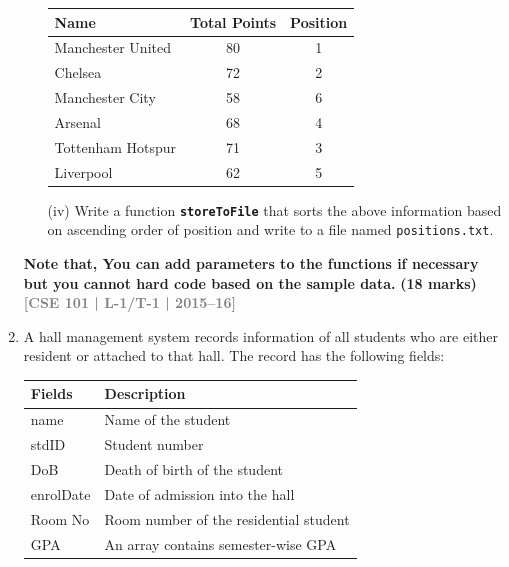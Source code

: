 \documentclass[12pt,a3paper]{article}
\newcommand{\yr}[1]{\hfill\textcolor{gray}{\small\textbf{[#1]}}}
\newcommand{\mk}[1]{\textcolor{orange!70!black}{\small\textbf{(#1 marks)}}}
\begin{document}
\begin{enumerate}
\begin{enumerate}
        \begin{center}
        \begin{tabular}{|l|c|c|}
        \hline
        \textbf{Name} & \textbf{Total Points} & \textbf{Position} \\
        \hline
        Manchester United & 80 & 1 \\
        \hline
        Chelsea           & 72 & 2 \\
        \hline
        Manchester City   & 58 & 6 \\
        \hline
        Arsenal           & 68 & 4 \\
        \hline
        Tottenham Hotspur & 71 & 3 \\
        \hline
        Liverpool         & 62 & 5 \\
        \hline
        \end{tabular}
        \end{center}

        \item[(iv)] Write a function \texttt{\textbf{storeToFile}} that sorts the above information based on ascending
        order of position and write to a file named \texttt{positions.txt}.
    \end{enumerate}

    \textbf{Note that, You can add parameters to the functions if necessary but you cannot
    hard code based on the sample data.}
\mk{18} \yr{CSE 101 | L-1/T-1 | 2015--16}

\item A hall management system records information of all students who are either resident
    or attached to that hall. The record has the following fields:

    \begin{center}
    \begin{tabular}{|l|l|}
    \hline
    \textbf{Fields} & \textbf{Description} \\
    \hline
    name       & Name of the student \\
    \hline
    stdID      & Student number \\
    \hline
    DoB        & Death of birth of the student \\
    \hline
    enrolDate  & Date of admission into the hall \\
    \hline
    Room No    & Room number of the residential student \\
    \hline
    GPA        & An array contains semester-wise GPA \\
    \hline
    \end{tabular}
    \end{center}


\end{enumerate}
\end{document}
